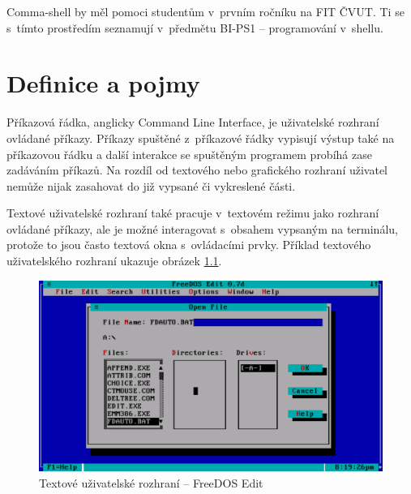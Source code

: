 \documentclass[thesis=M,czech]{FITthesis}[2012/06/26]
\begin{document}
\begin{introduction}
Comma-shell by měl pomoci studentům v~prvním ročníku na FIT ČVUT. Ti se s~tímto prostředím seznamují v~předmětu BI-PS1 --  programování v~shellu.




\end{introduction}

\chapter{Definice a pojmy}

Příkazová řádka, anglicky Command Line Interface, je uživatelské rozhraní ovládané příkazy. Příkazy spuštěné z~příkazové řádky vypisují výstup také na příkazovou řádku a další interakce se spuštěným programem probíhá zase zadáváním příkazů. Na rozdíl od textového nebo grafického rozhraní uživatel nemůže nijak zasahovat do již vypsané či vykreslené části.

Textové uživatelské rozhraní také pracuje v~textovém režimu jako rozhraní ovládané příkazy, ale je možné interagovat s~obsahem vypsaným na terminálu, protože to jsou často textová okna s~ovládacími prvky. Příklad textového uživatelského rozhraní ukazuje obrázek \ref{fig:tui}.

\begin{figure}
	\includegraphics[width=1.0\textwidth]{./images/TUI}
	\caption{Textové uživatelské rozhraní -- FreeDOS Edit \cite{fdedit}}
	\label{fig:tui}
\end{figure}
\end{document}
